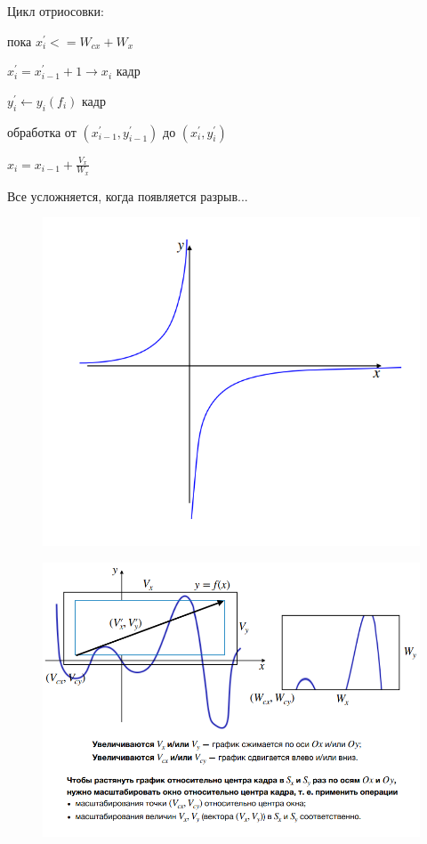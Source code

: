 \documentclass{article}
\begin{document}
Цикл отриосовки:

пока $x_{i}^{'} <= W_{cx}+W_x$

$x_{i}^{'} = x_{i-1}^{'}+1 \longrightarrow x_i$ кадр

$y_{i}^{'} \longleftarrow y_i (f_i)$ кадр

обработка от $(x_{i-1}^{'}, y_{i-1}^{'})$ до $(x_{i}^{'}, y_{i}^{'})$

$x_i = x_{i-1} + \frac{V_x}{W_x}$

\vspace{3mm}

Все усложняется, когда появляется разрыв... 
\begin{figure} [H]
    \includegraphics[width=0.70\linewidth]{Снимок экрана 2025-03-17 130158.png}
\end{figure}

\begin{figure} [H]
    \includegraphics[width=0.70\linewidth]{Снимок экрана 2025-03-17 131649.png}
\end{figure}
\end{document}
